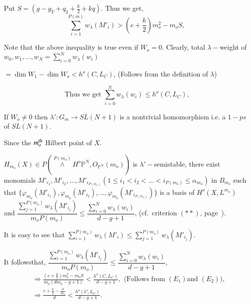 {\noindent
Put $S= (g - g_{\bar{Y}} + q_2 + \frac{k}{2} + kq)$. Thus we get, 
\begin{equation*}
\sum\limits^{P(m)}_{i = 1} w_{\lambda} (M'_{i}) > (e + \frac{k}{2})
m^2_o - m_o S, \tag{$E_1$} 
\end{equation*}

\noindent
Note that the above inequality is true even if $W_o = 0$. Clearly,
total $\lambda-$weight of $w_0, w_1, \ldots, w_N = \sum\limits^{N}_{i
  = 0} w_{\lambda} (w_i)$ 

\noindent
$= \dim W_1 - \dim W_o < h^o (C, L_C)$, (Follows from the definition
of $\lambda$) 

\noindent
\begin{equation*}
\text{ Thus we get } \sum\limits^{N}_{i = 0} w_\lambda (w_i) \le h^o
(C, L_C), \tag{$E_2$} 
\end{equation*}

If $W_o \neq 0$ then $\lambda' : G_m \to SL(N + 1)$ is a nontrivial
homomorphism i.e. a $1-ps$ of $SL(N+1)$. 

Since the $m^{\rm th}_{o}$ Hilbert point of $X$.

\noindent
$H_{m_o} (X) \in P(\overset{P(m_o)}\wedge H^o \mathbb{P}^{N},
O_{\mathbb{P}^N} (m_o))$ is $\lambda'- $semistable, there exist
monomials $M'_{i_1}, M'_{i_2}, \ldots, M'_{i_{P(m_o)}} (1 \le
i_1 < i_2 < \ldots < i_{P(m_o)} \le \alpha_{m_o})$ in $B_{m_o}$ such
that $\{\varphi_{m_o} (M'_{i_1}), \varphi_{m_o} (M'_{i_2}),
\ldots, \varphi_{m_o}(M'_{i_{P(m_o)}})\}$ is a basis of $H^o (X,
L^{m_o})$ and $\dfrac{\sum\limits^{P(m_o)} _{j=1} w_\lambda
  (M'_{i_j})}{m_o P(m_o)} \le \dfrac{\sum\limits^{N}_{i = 0}
  w_{\lambda} (w_i)}{d-g+1}$, (cf.\ criterion $(**)$, page~\pageref{page10}). 

\noindent
It is easy to see that $\sum\limits^{P(m_o)}_{i = 1} w_{\lambda}
(M'_{i}) \le \sum\limits^{P(m_o)}_{j = 1} w_{\lambda}
(M'_{i_j})$. 

\noindent
It follows\pageoriginale that, $\dfrac{\sum\limits^{P(m_o)} _{i=1} w_\lambda
  (M'_{i_j})}{m_o P(m_o)} \le \dfrac{\sum\limits^{N}_{i = 0}
  w_{\lambda} (w_i)}{d-g+1}$, 
\begin{align*}
& \Longrightarrow \frac{(e + \frac{k}{2})m^2_o - m_o S}{m_o (dm_o - g
    + 1)} < \frac{h^o (C, L_C)}{d- g+ 1}, \text{ (Follows from $(E_1)$
   and $(E_2)$)},\\ 
& \Longrightarrow \frac{e + \frac{k}{2} - \frac{S}{m_o}}{d} <
  \frac{h^o (C, L_C)}{d- g+ 1}. 
\end{align*}

}
